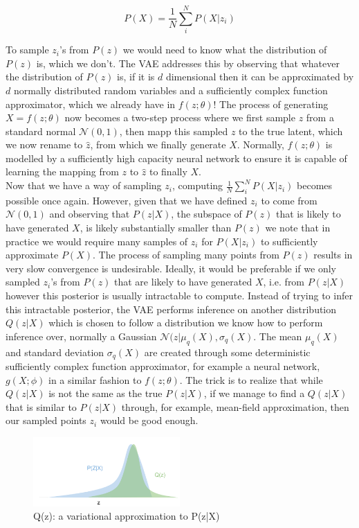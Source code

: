 \begin{equation}
    P(X) = \frac{1}{N} \sum_i^N P(X|z_i)
\end{equation}

To sample $z_i$'s from $P(z)$ we would need to know what the distribution of $P(z)$ is, which we don't. The VAE addresses this by observing that whatever the distribution of $P(z)$ is, if it is $d$ dimensional then it can be approximated by $d$ normally distributed random variables and a sufficiently complex function approximator, which we already have in $f(z;\theta)$! The process of generating $X = f(z; \theta)$ now becomes a two-step process where we first sample $z$ from a standard normal $\mathcal{N}(0,1)$, then mapp this sampled $z$ to the true latent, which we now rename to $\hat{z}$, from which we finally generate $X$. Normally, $f(z;\theta)$ is modelled by a sufficiently high capacity neural network to ensure it is capable of learning the mapping from $z$ to $\hat{z}$ to finally $X$.\\

Now that we have a way of sampling $z_i$, computing $\frac{1}{N} \sum_i^N P(X|z_i)$ becomes possible once again. However, given that we have defined $z_i$ to come from $\mathcal{N}(0,1)$ and observing that $P(z|X)$, the subspace of $P(z)$ that is likely to have generated $X$, is likely substantially smaller than $P(z)$ we note that in practice we would require many samples of $z_i$ for $P(X|z_i)$ to sufficiently approximate $P(X)$. The process of sampling many points from $P(z)$ results in very slow convergence is undesirable. Ideally, it would be preferable if we only sampled $z_i$'s from $P(z)$ that are likely to have generated $X$, i.e. from $P(z|X)$ however this posterior is usually intractable to compute. Instead of trying to infer this intractable posterior, the VAE performs inference on another distribution $Q(z|X)$ which is chosen to follow a distribution we know how to perform inference over, normally a Gaussian $\mathcal{N}(z|\mu_q(X), \sigma_q(X)$. The mean $\mu_q(X)$ and standard deviation $\sigma_q(X)$ are created through some deterministic sufficiently complex function approximator, for example a neural network, $g(X;\phi)$ in a similar fashion to $f(z;\theta)$. The trick is to realize that while $Q(z|X)$ is not the same as the true $P(z|X)$, if we manage to find a $Q(z|X)$ that is similar to $P(z|X)$ through, for example, mean-field approximation, then our sampled points $z_i$ would be good enough.

 \begin{figure}[htbp]
     \centering
     \includegraphics[width=0.5\textwidth]{images/mean-field.png}
     \caption{Q(z): a variational approximation to P(z|X) \citep{eric_jang}}
     \label{fig:mean_field}
 \end{figure}

